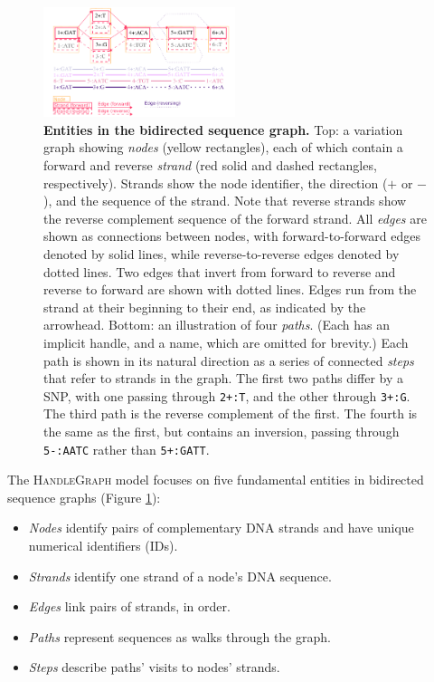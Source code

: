 \documentclass{bioinfo}
\begin{document}
\begin{methods}
\begin{figure}
	\begin{center}
		\includegraphics[width=0.5\textwidth]{figures/GRaphchrXpaper.pdf}
	\end{center}
	\caption{{\label{fig:graph}
        \textbf{Entities in the bidirected sequence graph.}
        Top: a variation graph showing \emph{nodes} (yellow rectangles), each of which contain a forward and reverse \emph{strand} (red solid and dashed rectangles, respectively).
        Strands show the node identifier, the direction ($+$ or $-$), and the sequence of the strand.
        Note that reverse strands show the reverse complement sequence of the forward strand.
        All \emph{edges} are shown as connections between nodes, with forward-to-forward edges denoted by solid lines, while reverse-to-reverse edges denoted by dotted lines.
        Two edges that invert from forward to reverse and reverse to forward are shown with dotted lines.
        Edges run from the strand at their beginning to their end, as indicated by the arrowhead.
        Bottom: an illustration of four \emph{paths}.
        (Each has an implicit handle, and a name, which are omitted for brevity.)
        Each path is shown in its natural direction as a series of connected \emph{steps} that refer to strands in the graph.
        The first two paths differ by a SNP, with one passing through \texttt{2+:T}, and the other through \texttt{3+:G}.
        The third path is the reverse complement of the first.
        The fourth is the same as the first, but contains an inversion, passing through \texttt{5-:AATC} rather than \texttt{5+:GATT}.
      }
    }
\end{figure}

The \textsc{HandleGraph} model focuses on five fundamental entities in bidirected sequence graphs (Figure \ref{fig:graph}):

\begin{itemize}
\item \emph{Nodes} identify pairs of complementary DNA strands and have unique numerical identifiers (IDs).
\item \emph{Strands} identify one strand of a node's DNA sequence.
\item \emph{Edges} link pairs of strands, in order.
\item \emph{Paths} represent sequences as walks through the graph.
\item \emph{Steps} describe paths' visits to nodes' strands.
\end{itemize}


\end{methods}
\end{document}
